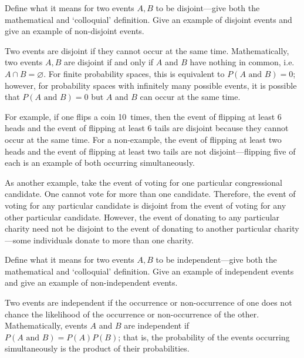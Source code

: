 \documentclass[11pt,letterpaper]{article}
\begin{document}

 Define what it means for two events $A, B$ to be disjoint---give both the mathematical and `colloquial' definition. Give an example of disjoint events and give an example of non-disjoint events. \pspace

\sol Two events are disjoint if they cannot occur at the same time. Mathematically, two events $A, B$ are disjoint if and only if $A$ and $B$ have nothing in common, i.e. $A \cap B= \varnothing$. For finite probability spaces, this is equivalent to $P(A \text{ and } B)= 0$; however, for probability spaces with infinitely many possible events, it is possible that $P(A \text{ and } B)= 0$ but $A$ and $B$ can occur at the same time. \pspace

For example, if one flips a coin 10~times, then the event of flipping at least 6 heads and the event of flipping at least 6 tails are disjoint because they cannot occur at the same time. For a non-example, the event of flipping at least two heads and the event of flipping at least two tails are not disjoint---flipping five of each is an example of both occurring simultaneously. \pspace

As another example, take the event of voting for one particular congressional candidate. One cannot vote for more than one candidate. Therefore, the event of voting for any particular candidate is disjoint from the event of voting for any other particular candidate. However, the event of donating to any particular charity need not be disjoint to the event of donating to another particular charity---some individuals donate to more than one charity. 



\newpage



 Define what it means for two events $A, B$ to be independent---give both the mathematical and `colloquial' definition. Give an example of independent events and give an example of non-independent events. \pspace

\sol Two events are independent if the occurrence or non-occurrence of one does not chance the likelihood of the occurrence or non-occurrence of the other. Mathematically, events $A$ and $B$ are independent if $P(A \text{ and } B)= P(A) P(B)$; that is, the probability of the events occurring simultaneously is the product of their probabilities. \pspace
\end{document}
